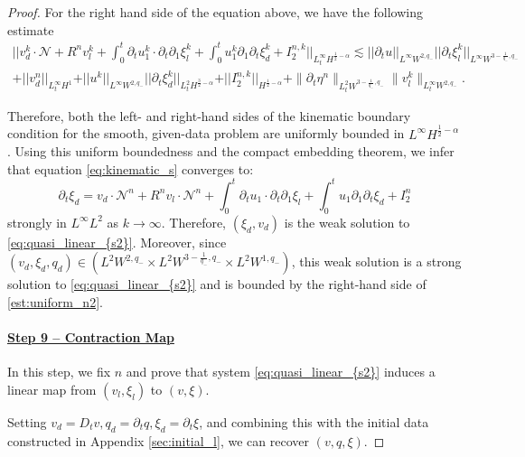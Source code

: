 \documentclass[letterpaper,reqno,10pt,twoside]{amsart}
\theoremstyle{definition}
\theoremstyle{remark}
\def\p{\partial}
\begin{document}
\begin{proof}
		\noindent For the right hand side of the equation above, we have the following estimate
		\[\begin{aligned}
			\vert \vert v_{d}^{k}\cdot \mathcal{N}+R^{n}v_{l}^{k}+\int_{0}^{t}\partial_{t}u_{1}^{k}\cdot \partial_{t}\partial_{1}\xi_{l}^{k}+\int_{0}^{t}u_1^{k}\partial_{1}\partial_{t}\xi_{d}^{k}+I_{2}^{n,k}\vert \vert_{L_{t}^{\infty}H^{\frac{1}{2}-\alpha}}
			\lesssim \vert \vert \partial_{t}u\vert \vert_{L^{\infty}W^{2,q_{-}}}\vert \vert \partial_{t}\xi_{l}^{k}\vert \vert_{L^{\infty}W^{3-\frac{1}{q_{-}},q_{-}}}\\
			+\vert \vert v_{d}^{n}\vert \vert_{L_{t}^{\infty}H^{1}}+\vert \vert u^{k}\vert \vert_{L^{\infty}W^{2,q_{-}}}\vert \vert \partial_{t}\xi_{d}^{k}\vert\vert_{L_{t}^{2}H^{\frac{3}{2}-\alpha}}+\vert \vert I_{2}^{n,k}\vert \vert_{H^{\frac{1}{2}-\alpha}}
			+\|\p_{t}\eta^{n}\|_{L_{t}^{2}W^{3-\frac{1}{q_{-}},q_{-}}}\|v_{l}^{k}\|_{L_{t}^{\infty}W^{2,q_{-}}}.
		\end{aligned}\]
		
		\noindent Therefore, both the left- and right-hand sides of the kinematic boundary condition for the smooth, given-data problem are uniformly bounded in $L^{\infty}H^{\frac{1}{2}-\alpha}$. Using this uniform boundedness and the compact embedding theorem, we infer that equation \eqref{eq:kinematic_s} converges to:
		\[
		\partial_{t}\xi_{d}=v_{d}\cdot \mathcal{N}^{n}+R^{n}v_{l}\cdot \mathcal{N}^{n}+\int_{0}^{t}\partial_{t}u_{1}\cdot \partial_{t}\partial_{1}\xi_{l}+\int_{0}^{t}u_1\partial_{1}\partial_{t}\xi_{d}+I^{n}_{2}
		\]
		\noindent strongly in $L^{\infty}L^{2}$ as $k\rightarrow \infty$. Therefore,  $(\xi_{d},v_{d})$ is the weak solution to \eqref{eq:quasi_linear_{s2}}. Moreover, since $(v_{d},\xi_{d},q_{d})\in (L^{2}W^{2,q_{-}}\times L^{2}W^{3-\frac{1}{q_{-}},q_{-}}\times L^{2}W^{1,q_{-}})$, this weak solution is a strong solution to \eqref{eq:quasi_linear_{s2}} and is bounded by the right-hand side of \eqref{est:uniform_n2}.
		
		{\paragraph{\underline{Step 9 -- Contraction Map}}
			
			In this step, we fix $n$ and prove that system \eqref{eq:quasi_linear_{s2}} induces a linear map from $(v_{l},\xi_{l})$ to $(v,\xi)$.
			
			Setting $v_{d}=D_{t}v, q_{d}=\p_{t}q, \xi_{d}=\p_{t}\xi$, and combining this with the initial data constructed in Appendix \ref{sec:initial_l}, we can recover $(v, q, \xi)$.
			
}
\end{proof}
\end{document}
